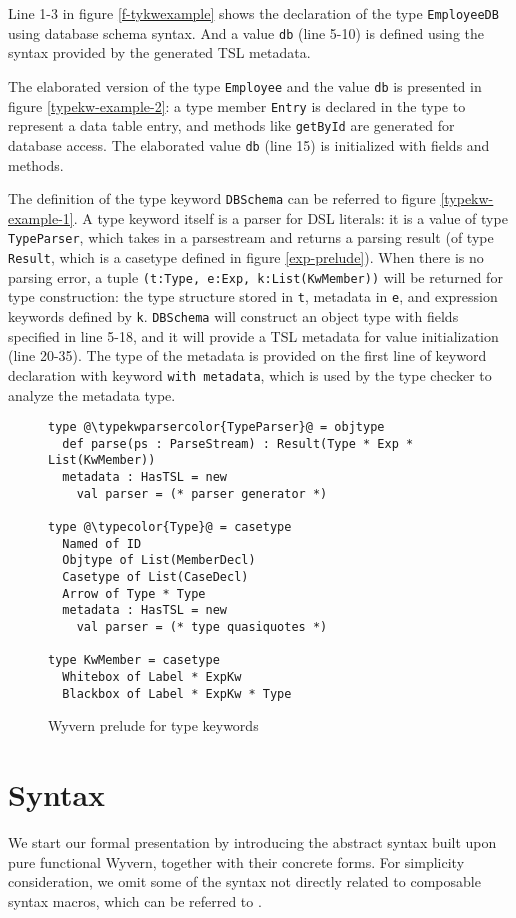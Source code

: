 \documentclass{sig-alternate}
\newcommand{\typekwparsercolor}[1]{\textcolor[HTML]{7C803E}{#1}}
\newcommand{\typecolor}[1]{\textcolor[HTML]{660066}{#1}}
\newcommand{\mycaption}[1]{\vspace{-4px}\caption{#1}\vspace{-2px}}
\begin{document}
Line 1-3 in figure \ref{f-tykwexample} shows the declaration of the type \verb|EmployeeDB| using database schema syntax. And a value \verb|db| (line 5-10) is defined using the syntax provided by the generated TSL metadata. 

The elaborated version of the type \verb|Employee| and the value \verb|db| is presented in figure \ref{typekw-example-2}: a type member \verb|Entry| is declared in the type to represent a data table entry, and methods like \verb|getById| are generated for database access. The elaborated value \verb|db| (line 15) is initialized with fields and methods.

The definition of the type keyword \verb|DBSchema| can be referred to figure \ref{typekw-example-1}. A type keyword itself is a parser for DSL literals: it is a value of type \verb|TypeParser|, which takes in a parsestream and returns a parsing result (of type \verb|Result|, which is a casetype defined in figure \ref{exp-prelude}). When there is no parsing error, a tuple \verb|(t:Type, e:Exp, k:List(KwMember))| will be returned for type construction: the type structure stored in \verb|t|, metadata in \verb|e|, and expression keywords defined by \verb|k|. \verb|DBSchema| will construct an object type with fields specified in line 5-18, and it will provide a TSL metadata for value initialization (line 20-35). The type of the metadata is provided on the first line of keyword declaration with keyword \verb|with metadata|, which is used by the type checker to analyze the metadata type.

\begin{figure}
\begin{lstlisting}[style=wyvern]
type @\typekwparsercolor{TypeParser}@ = objtype
  def parse(ps : ParseStream) : Result(Type * Exp * List(KwMember))
  metadata : HasTSL = new 
    val parser = (* parser generator *)

type @\typecolor{Type}@ = casetype
  Named of ID
  Objtype of List(MemberDecl)
  Casetype of List(CaseDecl)
  Arrow of Type * Type
  metadata : HasTSL = new
    val parser = (* type quasiquotes *)

type KwMember = casetype
  Whitebox of Label * ExpKw
  Blackbox of Label * ExpKw * Type
\end{lstlisting}
\mycaption{Wyvern prelude for type keywords}
\end{figure}



\section{Syntax}
We start our formal presentation by introducing the abstract syntax built upon pure functional Wyvern, together with their concrete forms. For simplicity consideration, we omit some of the syntax not directly related to composable syntax macros, which can be referred to .
\end{document}
